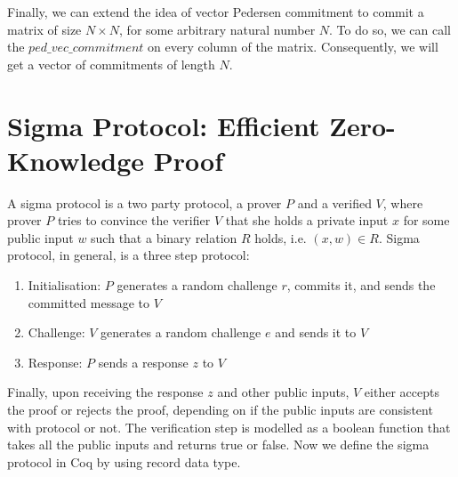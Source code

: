  
\noindent
Finally,  we can extend the idea of vector Pedersen commitment to commit a matrix of size  $N \times N$,  for some arbitrary natural number $N$.
To do so, we can call the $ped\_vec\_commitment$ on every column of the matrix.   Consequently, 
we  will get a vector of commitments of length $N$.



\section{Sigma Protocol: Efficient Zero-Knowledge Proof}
\label{sec:sigma_coq}
A sigma protocol is a two party protocol, a prover $P$ and a verified $V$, where prover $P$ tries to convince the verifier $V$ that she 
holds a private input $x$ for some public input $w$ such that a binary relation $R$ holds, i.e. $(x, w) \in R$.  Sigma protocol, 
in general, is a three step protocol:
\begin{enumerate}
\item Initialisation: $P$ generates a random challenge $r$, commits it, and sends the committed message to $V$
\item Challenge: $V$ generates a random challenge $e$ and sends it to $V$
\item Response: $P$ sends a response $z$ to $V$
\end{enumerate} 

\noindent
Finally, upon receiving the response $z$ and other public inputs, $V$ 
either accepts the proof or rejects the proof,  depending on if the public inputs are consistent with protocol or not.  The verification step is 
modelled as a boolean function that takes all the public inputs and returns true or false.  
Now we define the sigma protocol in Coq by using record data type.

